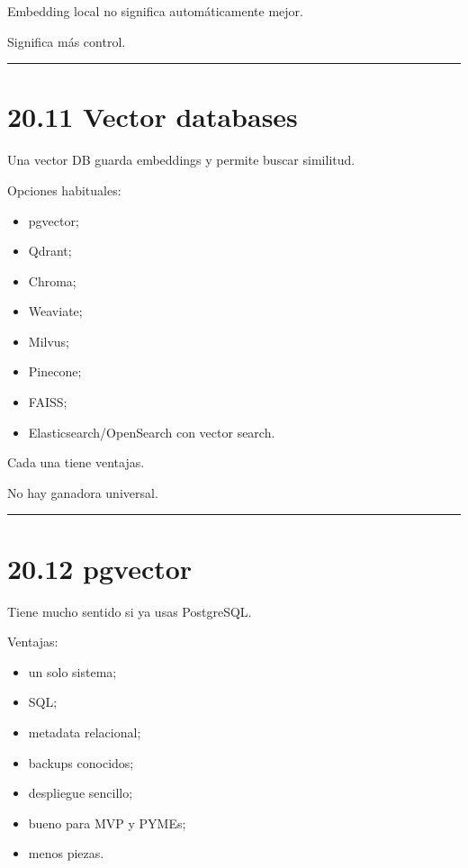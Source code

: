 Embedding local no significa automáticamente mejor.

Significa más control.

\begin{center}\rule{0.5\linewidth}{0.5pt}\end{center}

\section{20.11 Vector databases}\label{vector-databases}

Una vector DB guarda embeddings y permite buscar similitud.

Opciones habituales:

\begin{itemize}
\tightlist
\item
  pgvector;
\item
  Qdrant;
\item
  Chroma;
\item
  Weaviate;
\item
  Milvus;
\item
  Pinecone;
\item
  FAISS;
\item
  Elasticsearch/OpenSearch con vector search.
\end{itemize}

Cada una tiene ventajas.

No hay ganadora universal.

\begin{center}\rule{0.5\linewidth}{0.5pt}\end{center}

\section{20.12 pgvector}\label{pgvector-1}

Tiene mucho sentido si ya usas PostgreSQL.

Ventajas:

\begin{itemize}
\tightlist
\item
  un solo sistema;
\item
  SQL;
\item
  metadata relacional;
\item
  backups conocidos;
\item
  despliegue sencillo;
\item
  bueno para MVP y PYMEs;
\item
  menos piezas.
\end{itemize}

